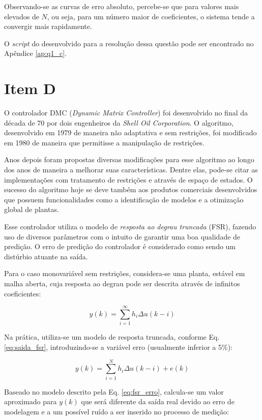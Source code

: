 Observando-se as curvas de erro absoluto, percebe-se que para valores mais
elevados de $N$, ou seja, para um número maior de coeficientes, o sistema
tende a convergir mais rapidamente.

O {\it script} do \Matlab desenvolvido para a resolução dessa questão pode
ser encontrado no Apêndice \ref{ap:q1_c}.

\section*{Item D}
O controlador DMC ({\it Dynamic Matrix Controller}) foi desenvolvido no final da
década de 70 por dois engenheiros da {\it Shell Oil Corporation}. O algoritmo,
desenvolvido em 1979 de maneira não adaptativa e sem restrições, foi modificado
em 1980 de maneira que permitisse a manipulação de restrições.

Anos depois foram propostas diversas modificações para esse algoritmo ao longo
dos anos de maneira a melhorar suas características. Dentre elas, pode-se citar
as implementações com tratamento de restrições e através de espaço de estados.
O sucesso do algoritmo hoje se deve também aos produtos comerciais desenvolvidos
que possuem funcionalidades como a identificação de modelos e a otimização
global de plantas.

Esse controlador utiliza o modelo de {\it resposta ao degrau truncada} (FSR),
fazendo uso de diversos parâmetros com o intuito de garantir uma boa qualidade
de predição. O erro de predição do controlador é considerado como sendo um
distúrbio atuante na saída.

Para o caso monovariável sem restrições, considera-se uma planta, estável em
malha aberta, cuja resposta ao degrau pode ser descrita através de infinitos
coeficientes:

\begin{equation}\label{eq:fsr_inf}
y(k) = \sum_{i=1}^\infty h_i\Delta u(k-i)
\end{equation}

Na prática, utiliza-se um modelo de resposta truncada, conforme Eq.
\ref{eq:saida_fsr}, introduzindo-se a variável erro (usualmente inferior a 5\%):

\begin{equation}\label{eq:fsr_erro}
y(k) = \sum_{i=1}^N h_i\Delta u(k-i) + e(k)
\end{equation}

Baseado no modelo descrito pela Eq. \ref{eq:fsr_erro}, calcula-se um valor
aproximado para $y(k)$ que será diferente da saída real devido ao erro de
modelagem e a um possível ruído a ser inserido no processo de medição: 

